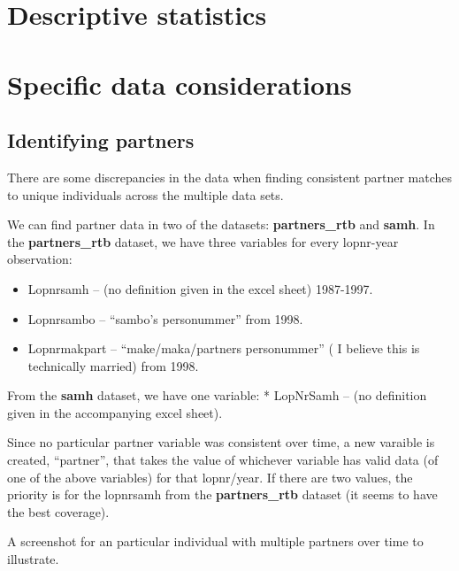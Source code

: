 \documentclass[
]{book}
\providecommand{\tightlist}{%
  \setlength{\itemsep}{0pt}\setlength{\parskip}{0pt}}
\begin{document}
\hypertarget{descriptive-statistics}{%
\section{Descriptive statistics}\label{descriptive-statistics}}

\hypertarget{specific-data-considerations}{%
\section{Specific data considerations}\label{specific-data-considerations}}

\hypertarget{identifying-partners}{%
\subsection{Identifying partners}\label{identifying-partners}}

There are some discrepancies in the data when finding consistent partner matches to unique individuals across the multiple data sets.

We can find partner data in two of the datasets: \textbf{partners\_rtb} and \textbf{samh}. In the \textbf{partners\_rtb} dataset, we have three variables for every lopnr-year observation:

\begin{itemize}
\tightlist
\item
  Lopnrsamh -- (no definition given in the excel sheet) 1987-1997.
\item
  Lopnrsambo -- ``sambo's personummer'' from 1998.
\item
  Lopnrmakpart -- ``make/maka/partners personummer'' ( I believe this is technically married) from 1998.
\end{itemize}

From the \textbf{samh} dataset, we have one variable:
* LopNrSamh -- (no definition given in the accompanying excel sheet).

Since no particular partner variable was consistent over time, a new varaible is created, ``partner'', that takes the value of whichever variable has valid data (of one of the above variables) for that lopnr/year. If there are two values, the priority is for the lopnrsamh from the \textbf{partners\_rtb} dataset (it seems to have the best coverage).

A screenshot for an particular individual with multiple partners over time to illustrate.
\end{document}
